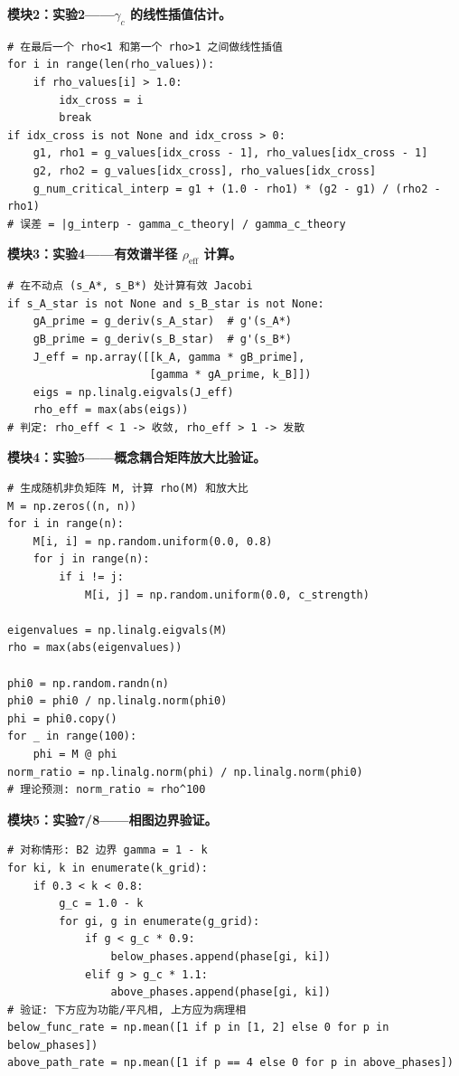 \documentclass[12pt,a4paper]{article}
\theoremstyle{definition}
\newcommand{\gamc}{\gamma_c}
\begin{document}
\textbf{模块2：实验2——$\gamc$ 的线性插值估计。}
\begin{lstlisting}[caption={$\gamc$ 的线性插值估计}, label={lst:interp}]
# 在最后一个 rho<1 和第一个 rho>1 之间做线性插值
for i in range(len(rho_values)):
    if rho_values[i] > 1.0:
        idx_cross = i
        break
if idx_cross is not None and idx_cross > 0:
    g1, rho1 = g_values[idx_cross - 1], rho_values[idx_cross - 1]
    g2, rho2 = g_values[idx_cross], rho_values[idx_cross]
    g_num_critical_interp = g1 + (1.0 - rho1) * (g2 - g1) / (rho2 - rho1)
# 误差 = |g_interp - gamma_c_theory| / gamma_c_theory
\end{lstlisting}

\textbf{模块3：实验4——有效谱半径 $\rho_{\mathrm{eff}}$ 计算。}
\begin{lstlisting}[caption={非线性耦合的有效谱半径计算}, label={lst:rho-eff}]
# 在不动点 (s_A*, s_B*) 处计算有效 Jacobi
if s_A_star is not None and s_B_star is not None:
    gA_prime = g_deriv(s_A_star)  # g'(s_A*)
    gB_prime = g_deriv(s_B_star)  # g'(s_B*)
    J_eff = np.array([[k_A, gamma * gB_prime],
                      [gamma * gA_prime, k_B]])
    eigs = np.linalg.eigvals(J_eff)
    rho_eff = max(abs(eigs))
# 判定: rho_eff < 1 -> 收敛, rho_eff > 1 -> 发散
\end{lstlisting}

\textbf{模块4：实验5——概念耦合矩阵放大比验证。}
\begin{lstlisting}[caption={定理4 的放大比验证}, label={lst:t4}]
# 生成随机非负矩阵 M, 计算 rho(M) 和放大比
M = np.zeros((n, n))
for i in range(n):
    M[i, i] = np.random.uniform(0.0, 0.8)
    for j in range(n):
        if i != j:
            M[i, j] = np.random.uniform(0.0, c_strength)

eigenvalues = np.linalg.eigvals(M)
rho = max(abs(eigenvalues))

phi0 = np.random.randn(n)
phi0 = phi0 / np.linalg.norm(phi0)
phi = phi0.copy()
for _ in range(100):
    phi = M @ phi
norm_ratio = np.linalg.norm(phi) / np.linalg.norm(phi0)
# 理论预测: norm_ratio ≈ rho^100
\end{lstlisting}

\textbf{模块5：实验7/8——相图边界验证。}
\begin{lstlisting}[caption={相图边界验证逻辑}, label={lst:phase}]
# 对称情形: B2 边界 gamma = 1 - k
for ki, k in enumerate(k_grid):
    if 0.3 < k < 0.8:
        g_c = 1.0 - k
        for gi, g in enumerate(g_grid):
            if g < g_c * 0.9:
                below_phases.append(phase[gi, ki])
            elif g > g_c * 1.1:
                above_phases.append(phase[gi, ki])
# 验证: 下方应为功能/平凡相, 上方应为病理相
below_func_rate = np.mean([1 if p in [1, 2] else 0 for p in below_phases])
above_path_rate = np.mean([1 if p == 4 else 0 for p in above_phases])
\end{lstlisting}
\end{document}
